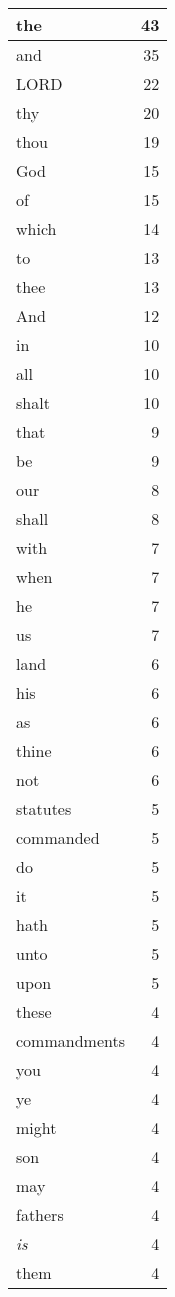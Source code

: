 \begin{center}
\begin{longtable}{l|r}
\hline \hline
\endlastfoot
the & 43 \\ \hline
and & 35 \\ \hline
LORD & 22 \\ \hline
thy & 20 \\ \hline
thou & 19 \\ \hline
God & 15 \\ \hline
of & 15 \\ \hline
which & 14 \\ \hline
to & 13 \\ \hline
thee & 13 \\ \hline
And & 12 \\ \hline
in & 10 \\ \hline
all & 10 \\ \hline
shalt & 10 \\ \hline
that & 9 \\ \hline
be & 9 \\ \hline
our & 8 \\ \hline
shall & 8 \\ \hline
with & 7 \\ \hline
when & 7 \\ \hline
he & 7 \\ \hline
us & 7 \\ \hline
land & 6 \\ \hline
his & 6 \\ \hline
as & 6 \\ \hline
thine & 6 \\ \hline
not & 6 \\ \hline
statutes & 5 \\ \hline
commanded & 5 \\ \hline
do & 5 \\ \hline
it & 5 \\ \hline
hath & 5 \\ \hline
unto & 5 \\ \hline
upon & 5 \\ \hline
these & 4 \\ \hline
commandments & 4 \\ \hline
you & 4 \\ \hline
ye & 4 \\ \hline
might & 4 \\ \hline
son & 4 \\ \hline
may & 4 \\ \hline
fathers & 4 \\ \hline
\emph{is} & 4 \\ \hline
them & 4 \\ \hline

\end{longtable}
\end{center}
